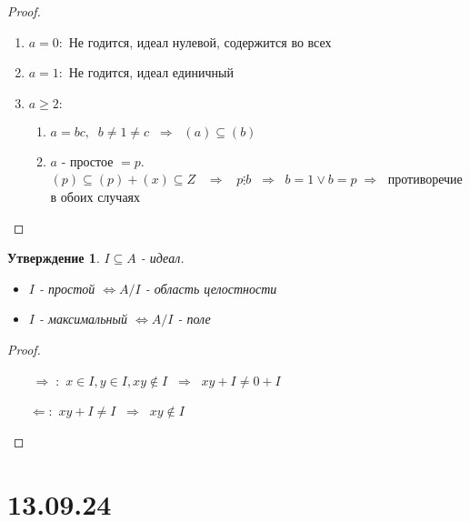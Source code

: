 \documentclass[12pt, a4paper]{article}
\newcommand{\lra}{\Leftrightarrow}
\newcommand{\ra}{\;\Rightarrow\;}
\newcommand{\la}{\Leftarrow}
\theoremstyle{plain}
\newtheorem*{Statement*}{Утверждение}
\theoremstyle{definition}
\begin{document}
\begin{proof}~\\
    \begin{enumerate}
        \item $a=0:$ Не годится, идеал нулевой, содержится во всех
        \item $a=1:$ Не годится, идеал единичный
        \item $a\geqslant2:$ 
            \begin{enumerate}[label*=\arabic*.]
                \item $a = bc,\;\; b\neq 1\neq c \; \ra\; (a)\subseteq (b)$
                \item $a$ - простое $ = p$.  $(p)\subseteq(p)+(x)\subseteq Z\;\; \ra\; \; p\vdots b \; \ra \; b = 1 \vee b = p\ra$ противоречие в обоих случаях
            \end{enumerate}
    \end{enumerate}
\end{proof}
\begin{Statement*}
    $I\subseteq A$ - идеал.
    \begin{itemize}
        \item $I$ - простой $\lra A/I$ - область целостности
        \item $I$ - максимальный $\lra A/I$ - поле
    \end{itemize}
\end{Statement*}
\begin{proof}~\\
    \begin{itemize}
        \item[$\ra:$]  $x\in I, y\in I, xy\notin I\; \ra \; xy+I\neq 0+I$
        \item[$\la:$]  $xy+I\neq I\; \ra \; xy\notin I$
\end{itemize}
\end{proof}
\section*{13.09.24}
\hypertarget{p4}{}
\end{document}
